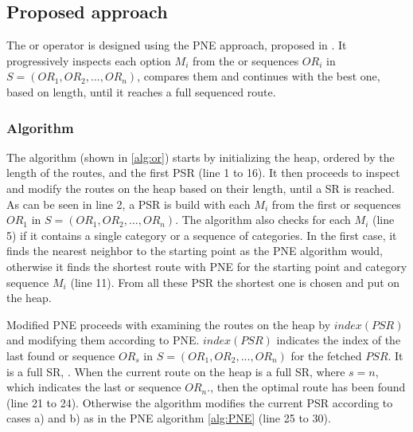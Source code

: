 \subsection{Proposed approach} 
\label{sec:approachOr}
The or operator is designed using the PNE approach, proposed in \cite{OSR}. It progressively inspects each option $M_i$ from the or sequences $OR_i$ in $S = (OR_1, OR_2, ..., OR_n)$, compares them and continues with the best one, based on length, until it reaches a full sequenced route.

\subsubsection{Algorithm}
\label{sec:algortihmOr}
The algorithm (shown in \ref{alg:or}) starts by initializing the heap, ordered by the length of the routes, and the first PSR (line 1 to 16). It then proceeds to inspect and modify the routes on the heap based on their length, until a SR is reached. As can be seen in line 2, a PSR is build with each $M_i$ from the first or sequences $OR_1$ in $S = (OR_1, OR_2, ..., OR_n)$. The algorithm also checks for each $M_i$ (line 5) if it contains a single category or a sequence of categories. In the first case, it finds the nearest neighbor to the starting point as the PNE algorithm would, otherwise it finds the shortest route with PNE for the starting point and category sequence $M_i$ (line 11). From all these PSR the shortest one is chosen and put on the heap.

Modified PNE proceeds with examining the routes on the heap by $index(PSR)$ and modifying them according to PNE. $index(PSR)$ indicates the index of the last found or sequence $OR_s$ in $S = (OR_1, OR_2, ..., OR_n)$ for the fetched $PSR$. It is a full SR, . When the current route on the heap is a full SR, where $s = n$, which indicates the last or sequence $OR_n.$, then the optimal route has been found (line 21 to 24). Otherwise the algorithm modifies the current PSR according to cases a) and b) as in the PNE algorithm \ref{alg:PNE} (line 25 to 30).

